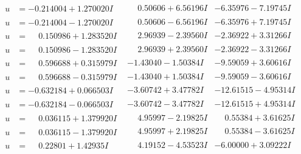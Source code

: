 \documentclass[1p]{elsarticle_modified}
\theoremstyle{definition}
\begin{document}
$$\begin{array}{c|c|c}
\begin{aligned}
u &= -0.214004 + 1.270020 I\end{aligned}
 & \phantom{-}0.50606 + 6.56196 I & -6.35976 - 7.19745 I \\ \hline\begin{aligned}
u &= -0.214004 - 1.270020 I\end{aligned}
 & \phantom{-}0.50606 - 6.56196 I & -6.35976 + 7.19745 I \\ \hline\begin{aligned}
u &= \phantom{-}0.150986 + 1.283520 I\end{aligned}
 & \phantom{-}2.96939 - 2.39560 I & -2.36922 + 3.31266 I \\ \hline\begin{aligned}
u &= \phantom{-}0.150986 - 1.283520 I\end{aligned}
 & \phantom{-}2.96939 + 2.39560 I & -2.36922 - 3.31266 I \\ \hline\begin{aligned}
u &= \phantom{-}0.596688 + 0.315979 I\end{aligned}
 & -1.43040 - 1.50384 I & -9.59059 + 3.60616 I \\ \hline\begin{aligned}
u &= \phantom{-}0.596688 - 0.315979 I\end{aligned}
 & -1.43040 + 1.50384 I & -9.59059 - 3.60616 I \\ \hline\begin{aligned}
u &= -0.632184 + 0.066503 I\end{aligned}
 & -3.60742 + 3.47782 I & -12.61515 - 4.95314 I \\ \hline\begin{aligned}
u &= -0.632184 - 0.066503 I\end{aligned}
 & -3.60742 - 3.47782 I & -12.61515 + 4.95314 I \\ \hline\begin{aligned}
u &= \phantom{-}0.036115 + 1.379920 I\end{aligned}
 & \phantom{-}4.95997 - 2.19825 I & \phantom{-}0.55384 + 3.61625 I \\ \hline\begin{aligned}
u &= \phantom{-}0.036115 - 1.379920 I\end{aligned}
 & \phantom{-}4.95997 + 2.19825 I & \phantom{-}0.55384 - 3.61625 I \\ \hline\begin{aligned}
u &= \phantom{-}0.22801 + 1.42935 I\end{aligned}
 & \phantom{-}4.19152 - 4.53523 I & -6.00000 + 3.09222 I \\ \hline\begin{aligned}

\end{aligned}
\end{array}$$
\end{document}

